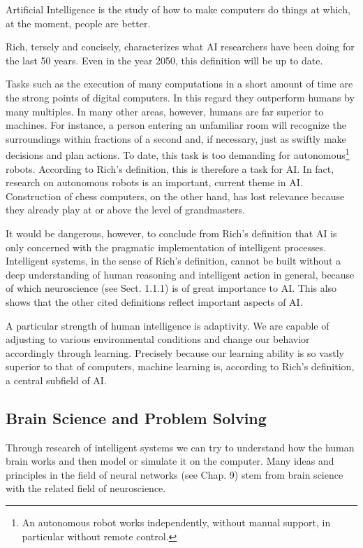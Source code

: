 \documentclass[10pt]{book}
\begin{document}
\begin{displayquote}
Artificial Intelligence is the study of how to make computers do things at which, at the moment, people are better.
\end{displayquote}

Rich, tersely and concisely, characterizes what AI researchers have been doing for the last 50 years. Even in the year 2050, this definition will be up to date.

Tasks such as the execution of many computations in a short amount of time are the strong points of digital computers. In this regard they outperform humans by many multiples. In many other areas, however, humans are far superior to machines. For instance, a person entering an unfamiliar room will recognize the surroundings within fractions of a second and, if necessary, just as swiftly make decisions and plan actions. To date, this task is too demanding for autonomous\footnote{An autonomous robot works independently, without manual support, in particular without remote control.} robots. According to Rich's definition, this is therefore a task for AI. In fact, research on autonomous robots is an important, current theme in AI. Construction of chess computers, on the other hand, has lost relevance because they already play at or above the level of grandmasters.

It would be dangerous, however, to conclude from Rich's definition that AI is only concerned with the pragmatic implementation of intelligent processes. Intelligent systems, in the sense of Rich's definition, cannot be built without a deep understanding of human reasoning and intelligent action in general, because of which neuroscience (see Sect. 1.1.1) is of great importance to AI. This also shows that the other cited definitions reflect important aspects of AI.

A particular strength of human intelligence is adaptivity. We are capable of adjusting to various environmental conditions and change our behavior accordingly through learning. Precisely because our learning ability is so vastly superior to that of computers, machine learning is, according to Rich's definition, a central subfield of AI.

\subsection{Brain Science and Problem Solving}
Through research of intelligent systems we can try to understand how the human brain works and then model or simulate it on the computer. Many ideas and principles in the field of neural networks (see Chap. 9) stem from brain science with the related field of neuroscience.
\end{document}
